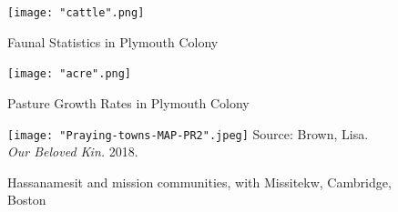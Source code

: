 \documentclass[11pt, oneside]{article}
\begin{document}
\begin{landscape}

\begin{figure}
\caption{Faunal Statistics in Plymouth Colony}
  \texttt{[image: "cattle".png]} 
\end{figure}

\begin{figure}
\caption{Pasture Growth Rates in Plymouth Colony}
  \texttt{[image: "acre".png]} 
\end{figure}

\begin{figure}
\caption{Hassanamesit and mission communities, with Missitekw, Cambridge, Boston}
  \texttt{[image: "Praying-towns-MAP-PR2".jpeg]} 
Source: Brown, Lisa. {\em Our Beloved Kin.} 2018.
\end{figure}

\end{landscape}


\end{document}
